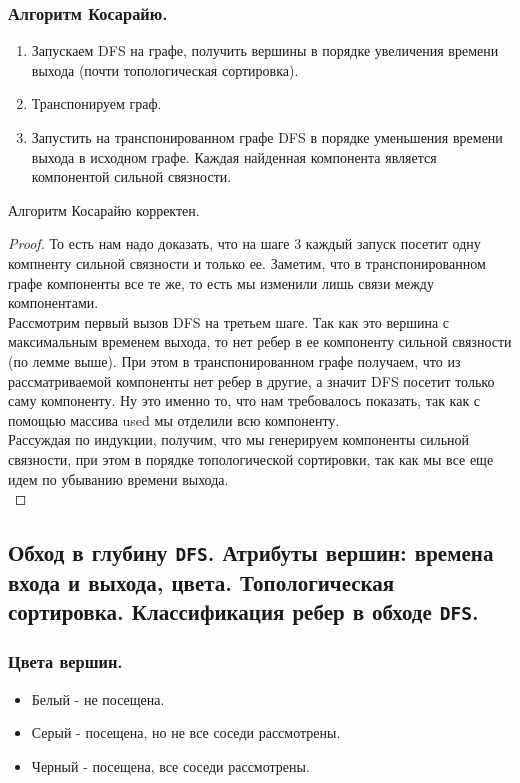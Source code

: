 \documentclass[a4paper,14pt]{article}
\begin{document}
    \subsubsection*{Алгоритм Косарайю.}
    \begin{enumerate}
        \item Запускаем DFS на графе, получить вершины в порядке
        увеличения времени выхода (почти топологическая
        сортировка).
        \item Транспонируем граф.
        \item Запустить на транспонированном графе DFS в порядке
        уменьшения времени выхода в исходном графе. Каждая
        найденная компонента является компонентой сильной
        связности.
    \end{enumerate}
    \begin{theorem}
        Алгоритм Косарайю корректен.
    \end{theorem}
    \begin{proof}
        То есть нам надо доказать, что на шаге 3 каждый запуск посетит
одну компненту сильной связности и только ее. Заметим, что в
транспонированном графе компоненты все те же, то есть мы
изменили лишь связи между компонентами. \\
Рассмотрим первый вызов DFS на третьем шаге. Так как это
вершина с максимальным временем выхода, то нет ребер в ее
компоненту сильной связности (по лемме выше). При этом в
транспонированном графе получаем, что из рассматриваемой
компоненты нет ребер в другие, а значит DFS посетит только саму
компоненту. Ну это именно то, что нам требовалось показать, так
как с помощью массива used мы отделили всю компоненту. \\
Рассуждая по индукции, получим, что мы генерируем компоненты
сильной связности, при этом в порядке топологической сортировки,
так как мы все еще идем по убыванию времени выхода. \\
    \end{proof}

    \subsection{Обход в глубину \texttt{DFS}. Атрибуты вершин: времена входа и выхода, цвета. Топологическая сортировка. Классификация ребер в обходе \texttt{DFS}.}

    \subsubsection*{Цвета вершин.}
    \begin{itemize}
        \item Белый - не посещена.
        \item Серый - посещена, но не все соседи рассмотрены.
        \item Черный - посещена, все соседи рассмотрены.
    \end{itemize}
\end{document}
